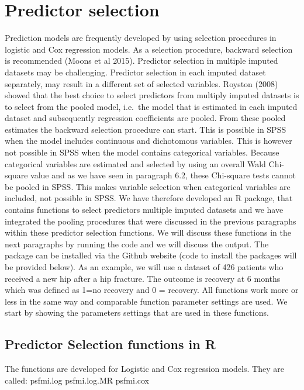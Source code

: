 \documentclass[]{book}
\theoremstyle{definition}
\theoremstyle{definition}
\theoremstyle{definition}
\theoremstyle{remark}
\begin{document}
\section{Predictor selection}\label{predictor-selection}

Prediction models are frequently developed by using selection procedures
in logistic and Cox regression models. As a selection procedure,
backward selection is recommended (Moons et al 2015). Predictor
selection in multiple imputed datasets may be challenging. Predictor
selection in each imputed dataset separately, may result in a different
set of selected variables. Royston (2008) showed that the best choice to
select predictors from multiply imputed datasets is to select from the
pooled model, i.e.~the model that is estimated in each imputed dataset
and subsequently regression coefficients are pooled. From these pooled
estimates the backward selection procedure can start. This is possible
in SPSS when the model includes continuous and dichotomous variables.
This is however not possible in SPSS when the model contains categorical
variables. Because categorical variables are estimated and selected by
using an overall Wald Chi-square value and as we have seen in paragraph
6.2, these Chi-square tests cannot be pooled in SPSS. This makes
variable selection when categorical variables are included, not possible
in SPSS. We have therefore developed an R package, that contains
functions to select predictors multiple imputed datasets and we have
integrated the pooling procedures that were discussed in the previous
paragraphs within these predictor selection functions. We will discuss
these functions in the next paragraphs by running the code and we will
discuss the output. The package can be installed via the Github website
(code to install the packages will be provided below). As an example, we
will use a dataset of 426 patients who received a new hip after a hip
fracture. The outcome is recovery at 6 months which was defined as 1=no
recovery and 0 = recovery. All functions work more or less in the same
way and comparable function parameter settings are used. We start by
showing the parameters settings that are used in these functions.

\subsection{Predictor Selection functions in
R}\label{predictor-selection-functions-in-r}

The functions are developed for Logistic and Cox regression models. They
are called: psfmi.log psfmi.log.MR psfmi.cox
\end{document}
